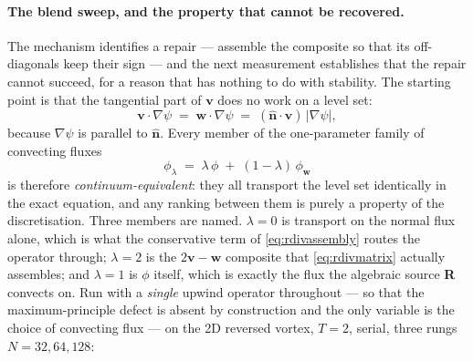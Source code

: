 \documentclass[preprint,3p,11pt]{elsarticle}
\newcommand{\psilev}{\psi}
\newcommand{\nhat}{\hat{\mathbf{n}}}
\newcommand{\gradpsi}{\lvert\nabla\psilev\rvert}
\begin{document}
\paragraph{The blend sweep, and the property that cannot be recovered.} The
mechanism identifies a repair --- assemble the composite so that its off-diagonals
keep their sign --- and the next measurement establishes that the repair cannot
succeed, for a reason that has nothing to do with stability. The starting point is
that the tangential part of $\mathbf{v}$ does no work on a level set:
\begin{equation}
  \mathbf{v}\cdot\nabla\psilev
  \;=\; \mathbf{w}\cdot\nabla\psilev
  \;=\; (\nhat\cdot\mathbf{v})\,\gradpsi ,
  \label{eq:tangentialnowork}
\end{equation}
because $\nabla\psilev$ is parallel to $\nhat$. Every member of the one-parameter
family of convecting fluxes
\begin{equation}
  \phi_\lambda \;=\; \lambda\,\phi \;+\; (1-\lambda)\,\phi_{\mathbf{w}}
  \label{eq:blend}
\end{equation}
is therefore \emph{continuum-equivalent}: they all transport the level set
identically in the exact equation, and any ranking between them is purely a
property of the discretisation. Three members are named. $\lambda = 0$ is
transport on the normal flux alone, which is what the conservative term of
\eqref{eq:rdivassembly} routes the operator through; $\lambda = 2$ is the
$2\mathbf{v}-\mathbf{w}$ composite that \eqref{eq:rdivmatrix} actually assembles;
and $\lambda = 1$ is $\phi$ itself, which is exactly the flux the algebraic source
\textbf{R} convects on. Run with a \emph{single} upwind operator throughout --- so
that the maximum-principle defect is absent by construction and the only variable
is the choice of convecting flux --- on the 2D reversed vortex, $T=2$, serial,
three rungs $N = 32, 64, 128$:
\end{document}
